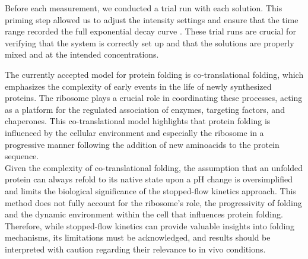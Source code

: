 \documentclass[a4paper,english,12pt,bibliography=totoc]{scrreprt}
\begin{document}
Before each measurement, we conducted a trial run with each solution. This priming step allowed us to adjust the intensity settings and ensure that the time range recorded the full exponential decay curve
. These trial runs are crucial for verifying that the system is correctly set up and that the solutions are properly mixed and at the intended concentrations.\\

The currently accepted model for protein folding is co-translational folding, which emphasizes the complexity of early events in the life of newly synthesized proteins. The ribosome plays a crucial role in coordinating these processes, acting as a platform for the regulated association of enzymes, targeting factors, and chaperones. This co-translational model highlights that protein folding is influenced by the cellular environment and especially the ribosome in a progressive manner \cite{kramer_ribosome_2009} following the addition of new aminoacids to the protein sequence.\\


Given the complexity of co-translational folding\cite{javed_ribosome_2017}, the assumption that an unfolded protein can always refold to its native state upon a pH change is oversimplified and limits the biological significance of the stopped-flow kinetics approach. This method does not fully account for the ribosome's role, the progressivity of folding and the dynamic environment within the cell that influences protein folding. Therefore, while stopped-flow kinetics can provide valuable insights into folding mechanisms, its limitations must be acknowledged, and results should be interpreted with caution regarding their relevance to in vivo conditions.
\end{document}
